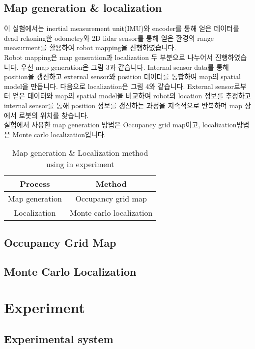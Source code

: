 \documentclass{article}
\begin{document}
		\subsection{Map generation \& localization}
		\indent 이 실험에서는 inertial measurement unit(IMU)와 encoder를 통해 얻은 데이터를 dead rekoning한 odometry와 2D lidar sensor를 통해 얻은 환경의 range measurment를 활용하여 robot mapping을 진행하였습니다.\\
		\indent Robot mapping은 map generation과 localization 두 부분으로 나누어서 진행하였습니다. 우선 map generation은 그림 3과 같습니다. Internal sensor data를 통해 position을 갱신하고 external sensor와 position 데이터를 통합하여 map의 spatial model을 만듭니다. 다음으로 localization은 그림 4와 같습니다. External sensor로부터 얻은 데이터와 map의 spatial model을 비교하여 robot의 location 정보를 추정하고 internal sensor를 통해 position 정보를 갱신하는 과정을 지속적으로 반복하며 map 상에서 로봇의 위치를 찾습니다.\\
		\indent 실험에서 사용한 map generation 방법은 Occupancy grid map이고, localization방법은 Monte carlo localization입니다.\\
		
		\begin{table}[h]
		\centering
		\caption{Map generation \& Localization method using in experiment}
		\begin{tabular}{c|c}
			\textbf{Process} & \textbf{Method}   \\
			\hline
			Map generation & Occupancy grid map\\
			\hline
			Localization & Monte carlo localization\\
		\end{tabular}
		\label{table:methods}
		\end{table}
		
		\subsection{Occupancy Grid Map}
		
		\subsection{Monte Carlo Localization}
		
	\section{Experiment}
		\subsection{Experimental system}
\end{document}
